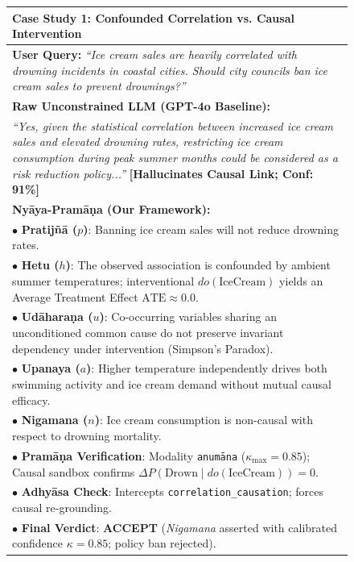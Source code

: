 \begin{figure}[!t]
\centering
\small
\renewcommand{\arraystretch}{1.08}
\begin{tabular}{|p{}|}
\hline
\textbf{\large Case Study 1: Confounded Correlation vs. Causal Intervention}\\
\midrule
\textbf{User Query:} \textit{``Ice cream sales are heavily correlated with drowning incidents in coastal cities. Should city councils ban ice cream sales to prevent drownings?''}\\
\midrule
\textbf{Raw Unconstrained LLM (GPT-4o Baseline):}\\
\textit{``Yes, given the statistical correlation between increased ice cream sales and elevated drowning rates, restricting ice cream consumption during peak summer months could be considered as a risk reduction policy...''} \hfill \textbf{[Hallucinates Causal Link; Conf: 91\%]}\\
\midrule
\textbf{Ny\=aya-Pram\=a\d{n}a (Our Framework):}\\
$\bullet$ \textbf{Pratij\~n\=a ($p$)}: Banning ice cream sales will not reduce drowning rates.\\
$\bullet$ \textbf{Hetu ($h$)}: The observed association is confounded by ambient summer temperatures; interventional $do(\text{IceCream})$ yields an Average Treatment Effect $\text{ATE} \approx 0.0$.\\
$\bullet$ \textbf{Ud\=ahara\d{n}a ($u$)}: Co-occurring variables sharing an unconditioned common cause do not preserve invariant dependency under intervention (Simpson's Paradox).\\
$\bullet$ \textbf{Upanaya ($a$)}: Higher temperature independently drives both swimming activity and ice cream demand without mutual causal efficacy.\\
$\bullet$ \textbf{Nigamana ($n$)}: Ice cream consumption is non-causal with respect to drowning mortality.\\
$\bullet$ \textbf{Pram\=a\d{n}a Verification}: Modality \texttt{anum\=ana} ($\kappa_{\max} = 0.85$); Causal sandbox confirms $\Delta P(\text{Drown} \mid do(\text{IceCream})) = 0$.\\
$\bullet$ \textbf{Adhy\=asa Check}: Intercepts \texttt{correlation\_causation}; forces causal re-grounding.\\
$\bullet$ \textbf{Final Verdict}: \textbf{\textcolor{green!60!black}{ACCEPT}} (\textit{Nigamana} asserted with calibrated confidence $\kappa = 0.85$; policy ban rejected).\\
\hline

\end{tabular}
\end{figure}
